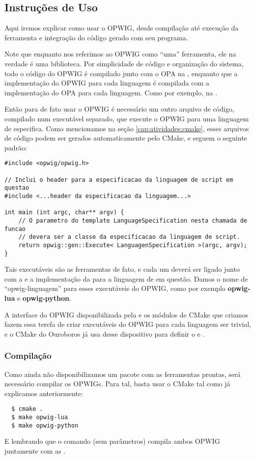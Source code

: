 \subsection{Instruções de Uso}
Aqui iremos explicar como usar o OPWIG, desde compilação até execução da ferramenta
e integração do código gerado com seu programa.

Note que enquanto nos referimos ao OPWIG como ``uma'' ferramenta, ele na verdade
é uma biblioteca. Por simplicidade de código e organização do sistema, 
todo o código do OPWIG é compilado junto com o OPA na , enquanto que 
a implementação do OPWIG para cada linguagem é compilada com a implementação do
OPA para cada linguagem. Como por exemplo, na .

Então para de fato usar o OPWIG é necessário um outro arquivo de código, compilado
num executável separado, que execute o OPWIG para uma linguagem de \script{} especifica.
Como mencionamos na seção \ref{cap:atividades:cmake}, esses arquivos de código podem
ser gerados automaticamente pelo CMake, e seguem o seguinte padrão:
\begin{lstlisting}
#include <opwig/opwig.h>

// Inclui o header para a especificacao da linguagem de script em questao
#include <...header da especificacao da linguagem...>

int main (int argc, char** argv) {
    // O parametro do template LanguageSpecification nesta chamada de funcao
    // devera ser a classe da especificacao da linguagem de script.
    return opwig::gen::Execute< LanguagenSpecification >(argc, argv);
}
\end{lstlisting}
Tais executáveis são as ferramentas de fato, e cada um deverá ser ligado junto com a
 e a implementação da  para a linguagem de \script{} em questão. 
Damos o nome de ``opwig-linguagem'' para esses executáveis do OPWIG, como por exemplo
\textbf{opwig-lua} e \textbf{opwig-python}.

A interface do OPWIG disponibilizada pela  e os módulos de CMake
que criamos fazem essa terefa de criar executáveis do OPWIG para cada linguagem ser trivial,
e o CMake do Ouroboros já usa desse dispositivo para definir o  e 
.

\subsubsection{Compilação}
Como ainda não disponibilizamos um pacote com as ferramentas prontas, será necessário
compilar os OPWIGs. Para tal, basta usar o CMake tal como já explicamos anteriormente:
\begin{verbatim}
  $ cmake .
  $ make opwig-lua
  $ make opwig-python
\end{verbatim}
E lembrando que o comando  (sem parâmetros) compila ambos OPWIG juntamente com
as .

